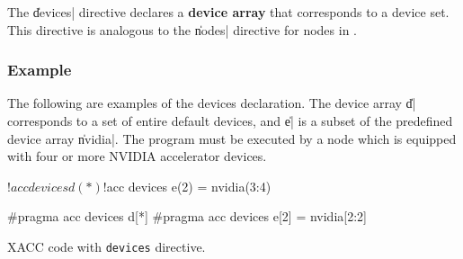 The \|devices| directive declares a {\bf device array} that corresponds
to a device set. This directive is analogous to the \|nodes| directive
for nodes in {\XMP}.




\subsubsection*{Example}

The following are examples of the devices declaration. The device array
\|d| corresponds to a set of entire default devices, and \|e| is a
subset of the predefined device array \|nvidia|. The program must be
executed by a node which is equipped with four or more NVIDIA
accelerator devices.
%
\begin{myfigure}
\begin{minipage}{0.45\hsize}
\begin{center}
\begin{XACCFexampleL}
!$acc devices d(*)
!$acc devices e(2) = nvidia(3:4)  
\end{XACCFexampleL}
\end{center}
\end{minipage}
%
\begin{minipage}{0.53\hsize}
\begin{center}
\begin{XACCCexampleR}
#pragma acc devices d[*]
#pragma acc devices e[2] = nvidia[2:2]
\end{XACCCexampleR}
\end{center}
\end{minipage}
\caption{XACC code with {\tt devices} directive.}\label{code:devices}
\end{myfigure}


